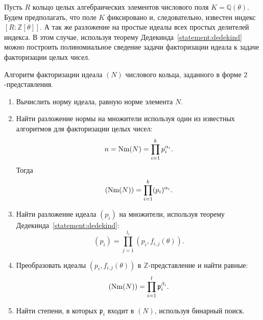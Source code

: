 \documentclass[_00_dissertation.tex]{subfiles}
\begin{document}
Пусть $R$ кольцо целых алгебраических элементов числового поля $K = \mathbb{Q}(\theta)$.
Будем предполагать, что поле $K$ фиксировано и, следовательно, известен индекс $[R: \mathbb{Z}[\theta]]$.
А так же разложение на простые идеалы всех простых делителей индекса.
В этом случае, используя теорему Дедекинда~\ref{statement:dedekind} можно построить полиномиальное сведение задачи факторизации идеала к задаче факторизации целых чисел.

\begin{algorithm}
    Алгоритм факторизации идеала $(N)$ числового кольца, заданного в форме $2$-представления.

    \begin{enumerate}        
        \item Вычислить норму идеала, равную норме элемента $N$.
        
        \item Найти разложение нормы на множители используя один из известных алгоритмов для факторизации целых чисел:
        \begin{equation*}
            n = \textrm{Nm}(N) = \prod_{i=1}^{k} p_i^{\alpha_i}.
        \end{equation*}
        Тогда
        \begin{equation*}
            (\textrm{Nm}(N)) = \prod_{i=1}^{k} (p_i)^{\alpha_i}.
        \end{equation*}
    
        \item Найти разложение идеала $(p_i)$ на множители, используя теорему Дедекинда~\ref{statement:dedekind}:
        \begin{equation*}
            (p_i) = \prod_{j=1}^{l_i} (p_i, f_{i, j}(\theta)).
        \end{equation*}
    
        \item Преобразовать идеалы $(p_i, f_{i, j}(\theta))$ в $\mathbb{Z}$-представление и найти равные:
        \begin{equation*}
            (\textrm{Nm}(N)) = \prod_{i=1}^{l} \mathfrak{p}_i^{\beta_i}.
        \end{equation*}
    
        \item Найти степени, в которых $\mathfrak{p}_i$ входит в $(N)$, используя бинарный поиск.
    \end{enumerate}
\end{algorithm}
\end{document}
